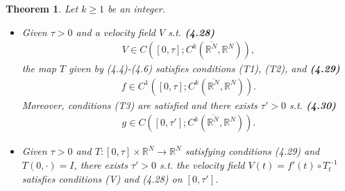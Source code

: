 \documentclass{book}
\numberwithin{equation}{section}
\newtheorem{theorem}{Theorem}[section]
\begin{document}
\begin{enumerate}
    \begin{theorem}
        Let $k\ge 1$ be an integer.
        \begin{itemize}
            \item[(i)] Given $\tau > 0$ and a velocity field $V$ s.t. \textbf{(4.28)}
            \begin{align*}
                V\in C([0,\tau];C^k(\overline{\mathbb{R}^N},\mathbb{R}^N)),
            \end{align*}
            the map $T$ given by (4.4)-(4.6) satisfies conditions (T1), (T2), and \textbf{(4.29)}
            \begin{align*}
                f\in C^1([0,\tau];C^k(\overline{\mathbb{R}^N},\mathbb{R}^N)).
            \end{align*}
            Moreover, conditions (T3) are satisfied and there exists $\tau' > 0$ s.t. \textbf{(4.30)}
            \begin{align*}
                g\in C([0,\tau'];C^k(\overline{\mathbb{R}^N},\mathbb{R}^N)).
            \end{align*}
            \item[(ii)] Given $\tau > 0$ and $T:[0,\tau]\times\mathbb{R}^N\to\mathbb{R}^N$ satisfying conditions (4.29) and $T(0,\cdot) = I$, there exists $\tau' > 0$ s.t. the velocity field $V(t) = f'(t)\circ T_t^{-1}$ satisfies conditions (V) and (4.28) on $[0,\tau']$.
        \end{itemize}
    \end{theorem}
\end{enumerate}
\end{document}
